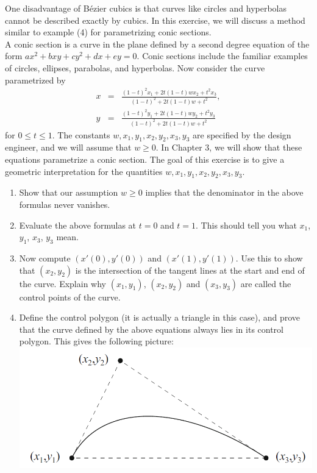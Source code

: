 \begin{exercise}{16}
One disadvantage of B\'ezier cubics is that curves like circles and hyperbolas cannot be described exactly by cubics. In this exercise, we will discuss a method similar to example (4) for parametrizing conic sections.\\

A conic section is a curve in the plane defined by a second degree equation of the form $ax^2 + bxy + cy^2 + dx + ey = 0$. Conic sections include the familiar examples of circles, ellipses, parabolas, and hyperbolas. Now consider the curve parametrized by
\begin{eqnarray*}
    x & = & \frac{(1-t)^2 x_1 + 2t(1-t)wx_2 + t^2 x_3}{(1-t)^2 + 2t(1-t)w + t^2},\\
    y & = & \frac{(1-t)^2 y_1 + 2t(1-t)wy_2 + t^2 y_3}{(1-t)^2 + 2t(1-t)w + t^2}    
\end{eqnarray*}
for $0\leq t\leq 1$. The constants $w,x_1,y_1,x_2,y_2,x_3,y_3$ are specified by the design engineer, and we will assume that $w\geq 0$. In Chapter $3$, we will show that these equations parametrize a conic section. The goal of this exercise is to give a geometric interpretation for the quantities $w,x_1,y_1,x_2,y_2,x_3,y_3$.
    \begin{enumerate}
        \item Show that our assumption $w\geq 0$ implies that the denominator in the above formulas never vanishes.
        \item Evaluate the above formulas at $t=0$ and $t=1$. This should tell you what $x_1$, $y_1$, $x_3$, $y_3$ mean.
        \item Now compute $(x'(0), y'(0))$ and $(x'(1), y'(1))$. Use this to show that $(x_2,y_2)$ is the intersection of the tangent lines at the start and end of the curve. Explain why $(x_1,y_1)$, $(x_2,y_2)$ and $(x_3,y_3)$ are called the control points of the curve.
        \item Define the control polygon (it is actually a triangle in this case), and prove that the curve defined by the above equations always lies in its control polygon. This gives the following picture:\\
        \includegraphics[width=0.8\linewidth]{cox-little-oshea/ch1/assets/sec1-3-ex16.png}

\end{enumerate}
\end{exercise}
